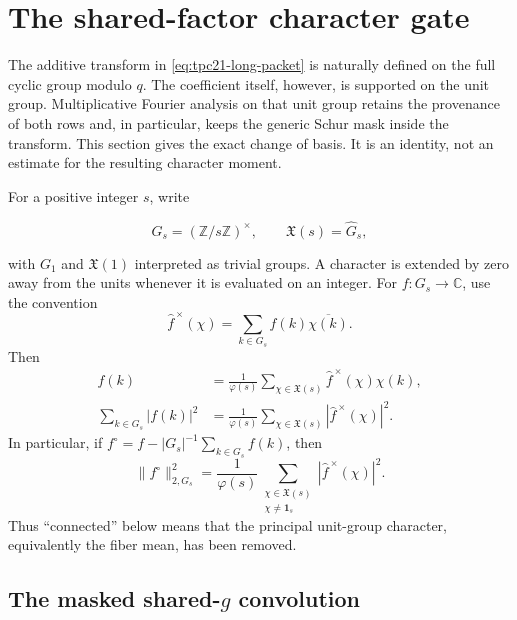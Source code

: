 \section{The shared-factor character gate}
\label{sec:tpc21-character}

The additive transform in \eqref{eq:tpc21-long-packet} is naturally
defined on the full cyclic group modulo \(q\).  The coefficient itself,
however, is supported on the unit group.  Multiplicative Fourier
analysis on that unit group retains the provenance of both rows and,
in particular, keeps the generic Schur mask inside the transform.  This
section gives the exact change of basis.  It is an identity, not an
estimate for the resulting character moment.

For a positive integer \(s\), write

\[
 G_s=(\mathbb Z/s\mathbb Z)^\times,
 \qquad
 \mathfrak X(s)=\widehat G_s,
\]

with \(G_1\) and \(\mathfrak X(1)\) interpreted as trivial groups.  A
character is extended by zero away from the units whenever it is
evaluated on an integer.  For \(f:G_s\to\mathbb C\), use the convention
\begin{equation}
 \widehat f^{\,\times}(\chi)
 =\sum_{k\in G_s}f(k)\overline{\chi(k)}.
 \label{eq:tpc21-multiplicative-transform}
\end{equation}
Then
\begin{align}
 f(k)
 &=\frac1{\varphi(s)}
   \sum_{\chi\in\mathfrak X(s)}
   \widehat f^{\,\times}(\chi)\chi(k),
 \label{eq:tpc21-multiplicative-inversion}\\
 \sum_{k\in G_s}|f(k)|^2
 &=\frac1{\varphi(s)}
   \sum_{\chi\in\mathfrak X(s)}
   |\widehat f^{\,\times}(\chi)|^2.
 \label{eq:tpc21-multiplicative-parseval}
\end{align}
In particular, if
\(f^\circ=f-|G_s|^{-1}\sum_{k\in G_s}f(k)\), then
\begin{equation}
 \boxed{
 \|f^\circ\|_{2,G_s}^2
 =\frac1{\varphi(s)}
  \sum_{\substack{\chi\in\mathfrak X(s)\\\chi\ne\mathbf1_s}}
  |\widehat f^{\,\times}(\chi)|^2.}
 \label{eq:tpc21-nonprincipal-parseval}
\end{equation}
Thus ``connected'' below means that the principal unit-group character,
equivalently the fiber mean, has been removed.

\subsection{The masked shared-\texorpdfstring{\(g\)}{g} convolution}

